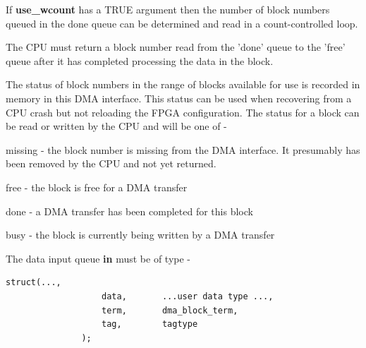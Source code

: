             If {\bf use\_wcount} has a TRUE argument then the number of block
            numbers queued in the done queue can be determined and read in
            a count-controlled loop.
            
            The CPU must return a block number read from the 'done' queue to the
            'free' queue after it has completed processing the data in the block.
            
            The status of block numbers in the range of blocks available for use
            is recorded in memory in this DMA interface. This status can be used
            when recovering from a CPU crash but not reloading the FPGA
            configuration. The status for a block can be read or written by the
            CPU and will be one of -

            \blist
            \item   missing - the block number is missing from the DMA interface.
            It presumably has been removed by the CPU and not yet returned.
            \item   free - the block is free for a DMA transfer
            \item   done - a DMA transfer has been completed for this block
            \item   busy - the block is currently being written by a DMA transfer
            \blend
                        
            The data input queue {\bf in} must be of type -

            \begin{lstlisting}[gobble=12, language=threepl]
               struct(...,
                   data,       ...user data type ...,
                   term,       dma_block_term,
                   tag,        tagtype
               );
            \end{lstlisting}

